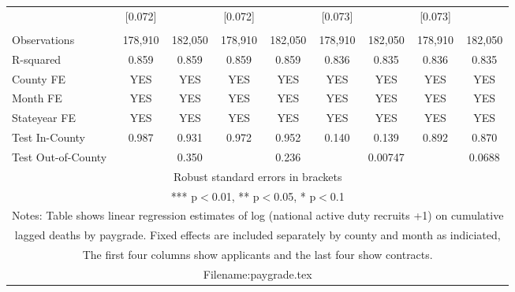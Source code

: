 \documentclass[]{article}
\begin{document}
\begin{tabular}{lcccccccc}
 & [0.072] &  & [0.072] &  & [0.073] &  & [0.073] &  \\
 &  &  &  &  &  &  &  &  \\
Observations & 178,910 & 182,050 & 178,910 & 182,050 & 178,910 & 182,050 & 178,910 & 182,050 \\
R-squared & 0.859 & 0.859 & 0.859 & 0.859 & 0.836 & 0.835 & 0.836 & 0.835 \\
County FE & YES & YES & YES & YES & YES & YES & YES & YES \\
Month FE & YES & YES & YES & YES & YES & YES & YES & YES \\
Stateyear FE & YES & YES & YES & YES & YES & YES & YES & YES \\
Test In-County & 0.987 & 0.931 & 0.972 & 0.952 & 0.140 & 0.139 & 0.892 & 0.870 \\
 Test Out-of-County &  & 0.350 &  & 0.236 &  & 0.00747 &  & 0.0688 \\ \hline
\multicolumn{9}{c}{ Robust standard errors in brackets} \\
\multicolumn{9}{c}{ *** p$<$0.01, ** p$<$0.05, * p$<$0.1} \\
\multicolumn{9}{c}{ Notes: Table shows linear regression estimates of log (national active duty recruits +1) on cumulative} \\
\multicolumn{9}{c}{ lagged deaths by paygrade. Fixed effects are included separately by county and month as indiciated,} \\
\multicolumn{9}{c}{ The first four columns show applicants and the last four show contracts.} \\
\multicolumn{9}{c}{ Filename:paygrade.tex} \\
\end{tabular}
\end{document}
